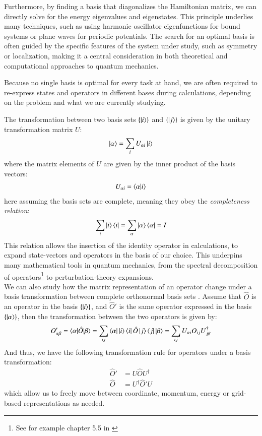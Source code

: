 \documentclass{subfiles}
\begin{document}
Furthermore, by finding a basis that diagonalizes the Hamiltonian matrix, we can directly solve for the energy eigenvalues and eigenstates. This principle underlies many techniques, such as using harmonic oscillator eigenfunctions for bound systems or plane waves for periodic potentials\cite{griffiths2018introduction, kittel2018introduction}. The search for an optimal basis is often guided by the specific features of the system under study, such as symmetry or localization, making it a central consideration in both theoretical and computational approaches to quantum mechanics. 

Because no single basis is optimal for every task at hand, we are often required to re-express states and operators in different bases during calculations, depending on the problem and what we are currently studying. 

The transformation between two basis sets $\{\ket{i}\}$ and $\{\ket{j}\}$ is given by the unitary transformation matrix $U$:
\begin{align*}
    \ket{\alpha} = \sum_i U_{\alpha i}\ket{i}
\end{align*}
where the matrix elements of $U$ are given by the inner product of the basis vectors:
\begin{align*}
    U_{\alpha i} = \braket{\alpha|i}
\end{align*}
here assuming the basis sets are complete, meaning they obey the \emph{completeness relation}:
\begin{align*}
    \sum_i \ket{i}\bra{i} = \sum_\alpha \ket{\alpha}\bra{\alpha} = I
\end{align*}
This relation allows the insertion of the identity operator in calculations, to expand state-vectors and operators in the basis of our choice. This underpins many mathematical tools in quantum mechanics, from the spectral decomposition of operators\footnote{See for example chapter 5.5 in \cite{strang2000linear}} to perturbation-theory expansions\cite{griffiths2018introduction, berera2021quantum, sakurai1986modern}. \\


We can also study how the matrix representation of an operator change under a basis transformation between complete orthonormal basis sets \cite{szabo1996modern}.
Assume that $\hat O$ is an operator in the basis $\{\ket{i}\}$, and $\hat O'$ is the same operator expressed in the basis $\{\ket{\alpha}\}$, then the transformation between the two operators is given by:
\begin{align*}
    O'_{\alpha\beta} = \braket{\alpha|\hat O|\beta} = \sum_{ij}\bra{\alpha}\ket{i}\bra{i}\hat O\ket{j}\bra{j}\ket{\beta} = \sum_{ij}U_{\alpha i}O_{ij}U^\dagger_{j\beta}
\end{align*}
And thus, we have the following transformation rule for operators under a basis transformation:
\begin{align*}
    \hat O' &= U\hat OU^\dagger \\
    \hat O &= U^\dagger\hat O'U
\end{align*}
which allow us to freely move between coordinate, momentum, energy or grid-based representations as needed.
\end{document}
